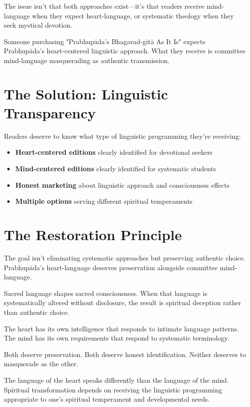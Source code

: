 \documentclass[11pt,twoside]{book}
\begin{document}
The issue isn't that both approaches exist—it's that readers receive mind-language when they expect heart-language, or systematic theology when they seek mystical devotion.

Someone purchasing "Prabhupāda's Bhagavad-gītā As It Is" expects Prabhupāda's heart-centered linguistic approach. What they receive is committee mind-language masquerading as authentic transmission.
\section*{The Solution: Linguistic Transparency}
\label{sec:orgb985794}

Readers deserve to know what type of linguistic programming they're receiving:

\begin{itemize}
\item \textbf{\textbf{Heart-centered editions}} clearly identified for devotional seekers
\item \textbf{\textbf{Mind-centered editions}} clearly identified for systematic students
\item \textbf{\textbf{Honest marketing}} about linguistic approach and consciousness effects
\item \textbf{\textbf{Multiple options}} serving different spiritual temperaments
\end{itemize}
\section*{The Restoration Principle}
\label{sec:orge3327d5}

The goal isn't eliminating systematic approaches but preserving authentic choice. Prabhupāda's heart-language deserves preservation alongside committee mind-language.

Sacred language shapes sacred consciousness. When that language is systematically altered without disclosure, the result is spiritual deception rather than authentic choice.

The heart has its own intelligence that responds to intimate language patterns. The mind has its own requirements that respond to systematic terminology.

Both deserve preservation. Both deserve honest identification. Neither deserves to masquerade as the other.

The language of the heart speaks differently than the language of the mind. Spiritual transformation depends on receiving the linguistic programming appropriate to one's spiritual temperament and developmental needs.
\end{document}
